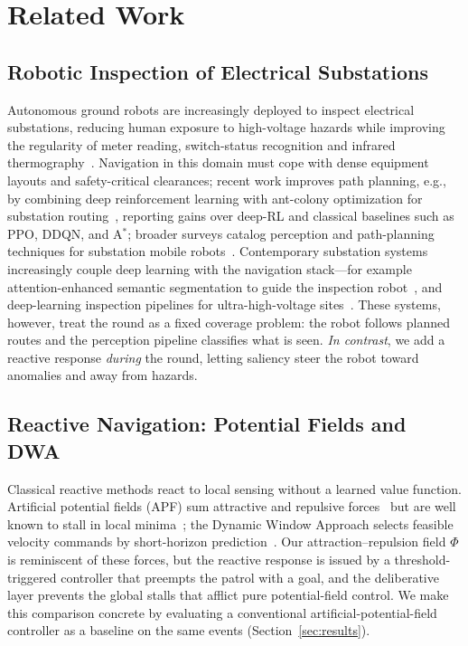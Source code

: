 \section{Related Work}
\label{sec:related}

\subsection{Robotic Inspection of Electrical Substations}
Autonomous ground robots are increasingly deployed to inspect electrical
substations, reducing human exposure to high-voltage hazards while improving
the regularity of meter reading, switch-status recognition and infrared
thermography~\cite{li2024state}. Navigation in this domain must cope
with dense equipment layouts and safety-critical clearances; recent work
improves path planning, e.g., by combining deep reinforcement learning with
ant-colony optimization for substation routing~\cite{zhang2025substation},
reporting gains over deep-RL and classical baselines such as PPO, DDQN, and
A$^{\!*}$; broader surveys catalog perception and path-planning techniques for
substation mobile robots~\cite{substationpp2024review}. Contemporary substation
systems increasingly couple deep learning with the navigation stack---for example
attention-enhanced semantic segmentation to guide the inspection
robot~\cite{substation2025segnav}, and deep-learning inspection pipelines for
ultra-high-voltage sites~\cite{substation2024uhvdl}. These systems, however,
treat the round as a fixed coverage problem: the robot follows planned routes and
the perception pipeline classifies what is seen.
\emph{In contrast}, we add a reactive response \emph{during} the
round, letting saliency steer the robot toward anomalies and away from hazards.

\subsection{Reactive Navigation: Potential Fields and DWA}
Classical reactive methods react to local sensing without a learned value
function. Artificial potential fields (APF) sum attractive and repulsive
forces~\cite{khatib1986} but are well known to stall in local
minima~\cite{koren1991}; the Dynamic Window Approach selects feasible
velocity commands by short-horizon prediction~\cite{fox1997}. Our
attraction--repulsion field $\Phi$ is reminiscent of these forces, but the reactive response is
issued by a threshold-triggered controller that preempts the patrol with a goal,
and the deliberative layer prevents the global stalls that afflict pure
potential-field control. We make this comparison concrete by evaluating a
conventional artificial-potential-field controller as a baseline on the same
events (Section~\ref{sec:results}).

